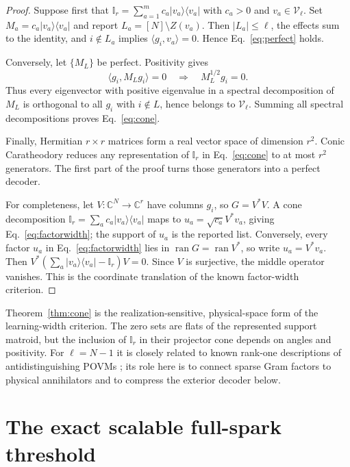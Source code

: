 \documentclass[11pt,a4paper]{article}
\newcommand{\C}{\mathbb{C}}
\newcommand{\I}{\mathbb{I}}
\newcommand{\ket}[1]{\lvert #1\rangle}
\newcommand{\bra}[1]{\langle #1\rvert}
\newcommand{\proj}[1]{\ket{#1}\!\bra{#1}}
\begin{document}
\begin{proof}
Suppose first that
$\I_r=\sum_{a=1}^m c_a\proj{v_a}$ with $c_a>0$ and
$v_a\in\mathcal V_\ell$.  Set $M_a=c_a\proj{v_a}$ and report
$L_a=[N]\setminus Z(v_a)$.  Then $|L_a|\le\ell$, the effects sum to the
identity, and $i\notin L_a$ implies $\langle g_i,v_a\rangle=0$.  Hence
Eq.~\eqref{eq:perfect} holds.

Conversely, let $\{M_L\}$ be perfect.  Positivity gives
\[
  \langle g_i,M_Lg_i\rangle=0
  \quad\Longrightarrow\quad M_L^{1/2}g_i=0.
\]
Thus every eigenvector with positive eigenvalue in a spectral decomposition of
$M_L$ is orthogonal to all $g_i$ with $i\notin L$, hence belongs to
$\mathcal V_\ell$.  Summing all spectral decompositions proves
Eq.~\eqref{eq:cone}.

Finally, Hermitian $r\times r$ matrices form a real vector space of dimension
$r^2$.  Conic Caratheodory reduces any representation of $\I_r$ in
Eq.~\eqref{eq:cone} to at most $r^2$ generators.  The first part of the proof
turns those generators into a perfect decoder.

For completeness, let $V:\C^N\to\C^r$ have columns $g_i$, so $G=V^*V$.
A cone decomposition $\I_r=\sum_a c_a\proj{v_a}$ maps to
$u_a=\sqrt{c_a}V^*v_a$, giving Eq.~\eqref{eq:factorwidth}; the support of
$u_a$ is the reported list.  Conversely, every factor $u_a$ in
Eq.~\eqref{eq:factorwidth} lies in $\operatorname{ran}G=\operatorname{ran}V^*$,
so write $u_a=V^*v_a$.  Then
$V^*(\sum_a\proj{v_a}-\I_r)V=0$.  Since $V$ is surjective, the middle
operator vanishes.  This is the coordinate translation of the known
factor-width criterion.
\end{proof}

Theorem~\ref{thm:cone} is the realization-sensitive, physical-space form of
the learning-width criterion.  The zero sets are flats of
the represented support matroid, but the inclusion of $\I_r$ in their
projector cone depends on angles and positivity.  For $\ell=N-1$ it is closely
related to known rank-one descriptions of antidistinguishing POVMs
\cite{HeinosaariKerppo2018}; its role here is to connect sparse Gram factors
to physical annihilators and to compress the exterior decoder below.

\section{The exact scalable full-spark threshold}\label{sec:headline}
\end{document}
